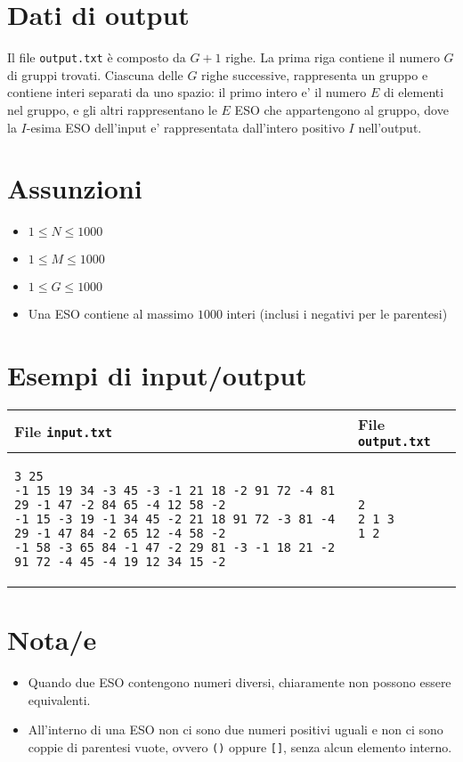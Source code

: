 \documentclass[a4paper,11pt]{article}
\begin{document}
\section*{Dati di output}

Il file \texttt{output.txt} è composto da $G+1$
righe. La prima riga contiene il numero $G$ di gruppi
trovati. Ciascuna delle $G$ righe successive, rappresenta un
gruppo e contiene interi separati da uno spazio: il primo intero e' il
numero $E$ di elementi nel gruppo, e gli altri rappresentano
le $E$ ESO che
appartengono al gruppo, dove la $I$-esima ESO dell'input e'
rappresentata dall'intero positivo $I$ nell'output.

\section*{Assunzioni}
\begin{itemize}
  \item $1 ≤ N ≤ 1000$
  \item $1 ≤ M ≤ 1000$
  \item $1 ≤ G ≤ 1000$
  \item Una ESO contiene al massimo $1000$ interi (inclusi i negativi per le parentesi)
\end{itemize}

\section*{Esempi di input/output}
    \noindent
    \begin{tabular}{p{11cm}|p{5cm}}
    \toprule
    \textbf{File \texttt{input.txt}}
    & \textbf{File \texttt{output.txt}}
    \\
    \midrule
    \scriptsize
    \begin{verbatim}
3 25
-1 15 19 34 -3 45 -3 -1 21 18 -2 91 72 -4 81 29 -1 47 -2 84 65 -4 12 58 -2
-1 15 -3 19 -1 34 45 -2 21 18 91 72 -3 81 -4 29 -1 47 84 -2 65 12 -4 58 -2
-1 58 -3 65 84 -1 47 -2 29 81 -3 -1 18 21 -2 91 72 -4 45 -4 19 12 34 15 -2
\end{verbatim}
    &
    \scriptsize
    \begin{verbatim}
2
2 1 3
1 2
\end{verbatim}
    \\
    \bottomrule
    \end{tabular}
  
\section*{Nota/e}
\begin{itemize}
  \item Quando due ESO contengono numeri diversi, chiaramente non possono essere equivalenti.
  \item All'interno di una ESO non ci sono due numeri positivi uguali e non ci sono coppie di parentesi vuote, ovvero \texttt{()} oppure \texttt{[]}, senza alcun elemento interno.
\end{itemize}
\end{document}
